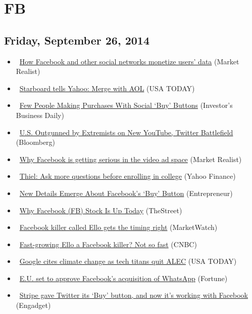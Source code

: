 \documentclass[11pt,asymmetric]{article}
\begin{document}
\section*{FB}

\subsection*{Friday, September 26, 2014}
\begin{itemize}
\item\ \href{http://finance.yahoo.com/news/facebook-other-social-networks-monetize-192951081.html}{How Facebook and other social networks monetize users’ data} (Market Realist)
\item\ \href{http://www.usatoday.com/story/tech/2014/09/26/starboard-yahoo-aol/16266855/}{Starboard tells Yahoo: Merge with AOL} (USA TODAY)
\item\ \href{http://news.investors.com/092614-719173-few-internet-users-buy-with-buy-buttons-on-social-websites.htm?ven=yahoocp&src=aurlled&ven=yahoo}{Few People Making Purchases With Social `Buy' Buttons} (Investor's Business Daily)
\item\ \href{http://finance.yahoo.com/news/u-outgunned-extremists-social-media-040015318.html}{U.S. Outgunned by Extremists on New YouTube, Twitter Battlefield} (Bloomberg)
\item\ \href{http://finance.yahoo.com/news/why-facebook-getting-serious-video-170005666.html}{Why Facebook is getting serious in the video ad space} (Market Realist)
\item\ \href{http://finance.yahoo.com/news/thiel--ask-more-questions-before-enrolling-in-college-200631114.html}{Thiel: Ask more questions before enrolling in college} (Yahoo Finance)
\item\ \href{http://finance.yahoo.com/news/details-emerge-facebooks-buy-button-154300476.html}{New Details Emerge About Facebook's `Buy' Button} (Entrepreneur)
\item\ \href{http://www.thestreet.com/story/12893733/1/why-facebook-fb-stock-is-up-today.html?puc=yahoo&cm_ven=YAHOO}{Why Facebook (FB) Stock Is Up Today} (TheStreet)
\item\ \href{http://www.marketwatch.com/News/Story/Story.aspx?guid=2D417042-4469-11E4-B28B-1FD1A673269F&siteid=yhoof2}{Facebook killer called Ello gets the timing right} (MarketWatch)
\item\ \href{http://www.cnbc.com/id/102032855?__source=yahoo%7cfinance%7cheadline%7cheadline%7cstory&par=yahoo&doc=102032855}{Fast-growing Ello a Facebook killer? Not so fast} (CNBC)
\item\ \href{http://www.usatoday.com/story/money/business/2014/09/26/tech-titans-bolt-conservative-alec-over-climate-flap/16233881/}{Google cites climate change as tech titans quit ALEC} (USA TODAY)
\item\ \href{http://finance.yahoo.com/news/e-u-set-approve-facebook-102718691.html}{E.U. set to approve Facebook’s acquisition of WhatsApp} (Fortune)
\item\ \href{http://www.engadget.com/2014/09/26/facebook-buy-stripe/?ncid=rss_truncated}{Stripe gave Twitter its `Buy' button, and now it's working with Facebook} (Engadget)
\end{itemize}
\end{document}
